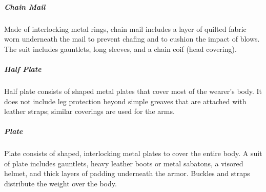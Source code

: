 \subparagraph*{Chain Mail} Made of interlocking metal rings, chain mail includes a layer of quilted fabric worn underneath the mail to prevent chafing and to cushion the impact of blows. The suit includes gauntlets, long sleeves, and a chain coif (head covering).

\subparagraph*{Half Plate} Half plate consists of shaped metal plates that cover most of the wearer's body. It does not include leg protection beyond simple greaves that are attached with leather straps; similar coverings are used for the arms.

\subparagraph*{Plate} Plate consists of shaped, interlocking metal plates to cover the entire body. A suit of plate includes gauntlets, heavy leather boots or metal sabatons, a visored helmet, and thick layers of padding underneath the armor. Buckles and straps distribute the weight over the body.

